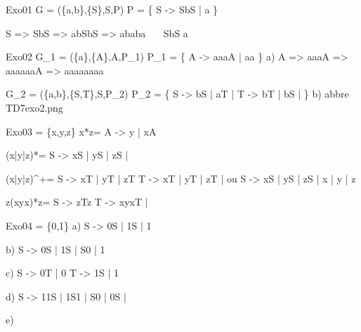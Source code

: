 Exo01
G = (\{a,b\},\{S\},S,P)
P = \{
	S -> SbS | a
\}

S => SbS => abSbS => ababa
	 \  \
	  \ SbS
	   a

Exo02
G_1 = (\{a\},\{A\},A,P_1)
P_1 = \{
	A -> aaaA | aa
\}
a) A => aaaA => aaaaaaA => aaaaaaaa

G_2 = (\{a,b\},\{S,T\},S,P_2)
P_2 = \{
	S -> bS | aT | \varepsilon
	T -> bT | bS | \varepsilon
\}
b) abbre TD7exo2.png


Exo03
\sigma = \{x,y,z\}
x*z=
A -> y | xA

(x|y|z)*=
S -> xS | yS | zS | \varepsilon

(x|y|z)^+=
S -> xT | yT | zT
T -> xT | yT | zT | \varepsilon
ou
S -> xS | yS | zS | x | y | z

z(xyx)*z=
S -> zTz
T -> xyxT | \varepsilon


Exo04
\sigma = \{0,1\}
a)	S -> 0S | 1S | 1

b)	S -> 0S | 1S | S0 | 1

c)	S -> 0T | 0
	T -> 1S | 1

d)	S -> 11S | 1S1 | S0 | 0S | \varepsilon

e)	